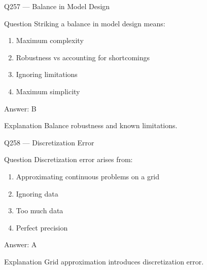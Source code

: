 \documentclass[aspectratio=169,8pt]{beamer}
\begin{document}
								\begin{frame}{Q257 --- Balance in Model Design}
									\begin{block}{Question}
										Striking a balance in model design means:
										\begin{enumerate}
											\item Maximum complexity
											\item Robustness vs accounting for shortcomings
											\item Ignoring limitations
											\item Maximum simplicity
										\end{enumerate}
									\end{block}
									\begin{exampleblock}{Answer: B}\end{exampleblock}
									\begin{block}{Explanation}
										Balance robustness and known limitations.
									\end{block}
								\end{frame}
								
								\begin{frame}{Q258 --- Discretization Error}
									\begin{block}{Question}
										Discretization error arises from:
										\begin{enumerate}
											\item Approximating continuous problems on a grid
											\item Ignoring data
											\item Too much data
											\item Perfect precision
										\end{enumerate}
									\end{block}
									\begin{exampleblock}{Answer: A}\end{exampleblock}
									\begin{block}{Explanation}
										Grid approximation introduces discretization error.
									\end{block}
								\end{frame}
								
\end{document}
